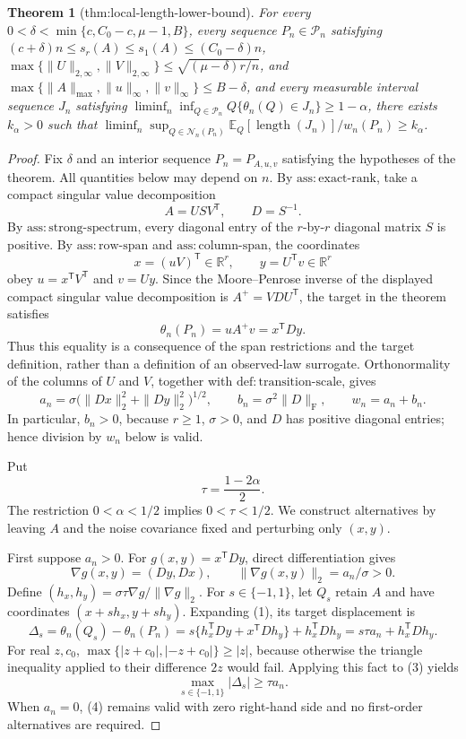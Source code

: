 \documentclass{article}
\newtheorem{theorem}{Theorem}
\begin{document}
\begin{theorem}[thm:local-length-lower-bound]\label{thm:local-length-lower-bound}
For every \(0<\delta<\min\{c,C_0-c,\mu-1,B\}\), every sequence \(P_n\in\mathcal P_n\) satisfying \((c+\delta)n\le s_r(A)\le s_1(A)\le(C_0-\delta)n\), \(\max\{\|U\|_{2,\infty},\|V\|_{2,\infty}\}\le\sqrt{(\mu-\delta)r/n}\), and \(\max\{\|A\|_{\max},\|u\|_\infty,\|v\|_\infty\}\le B-\delta\), and every measurable interval sequence \(J_n\) satisfying \(\liminf_n\inf_{Q\in\mathcal P_n}Q\{\theta_n(Q)\in J_n\}\ge1-\alpha\), there exists \(k_\alpha>0\) such that \(\liminf_n\sup_{Q\in\mathcal N_n(P_n)}\mathbb E_Q[\operatorname{length}(J_n)]/w_n(P_n)\ge k_\alpha\).
\end{theorem}
\begin{proof}
Fix \(\delta\) and an interior sequence \(P_n=P_{A,u,v}\) satisfying the hypotheses of the theorem.  All quantities below may depend on \(n\).  By \(\mathrm{ass{:}exact\mbox{-}rank}\), take a compact singular value decomposition
\[
A=USV^{\mathsf T},
\qquad
D=S^{-1}.
\]
By \(\mathrm{ass{:}strong\mbox{-}spectrum}\), every diagonal entry of the \(r\)-by-\(r\) diagonal matrix \(S\) is positive.  By \(\mathrm{ass{:}row\mbox{-}span}\) and \(\mathrm{ass{:}column\mbox{-}span}\), the coordinates
\[
x=(uV)^{\mathsf T}\in\mathbb R^r,
\qquad
y=U^{\mathsf T}v\in\mathbb R^r
\]
obey \(u=x^{\mathsf T}V^{\mathsf T}\) and \(v=Uy\).  Since the Moore--Penrose inverse of the displayed compact singular value decomposition is \(A^+=V D U^{\mathsf T}\), the target in the theorem satisfies
\[
\theta_n(P_n)=uA^+v=x^{\mathsf T}Dy. \tag{1}
\]
Thus this equality is a consequence of the span restrictions and the target definition, rather than a definition of an observed-law surrogate.  Orthonormality of the columns of \(U\) and \(V\), together with \(\mathrm{def{:}transition\mbox{-}scale}\), gives
\[
a_n=\sigma\bigl(\|Dx\|_2^2+\|Dy\|_2^2\bigr)^{1/2},
\qquad
b_n=\sigma^2\|D\|_{\mathrm F},
\qquad
w_n=a_n+b_n. \tag{2}
\]
In particular, \(b_n>0\), because \(r\geq1\), \(\sigma>0\), and \(D\) has positive diagonal entries; hence division by \(w_n\) below is valid.

Put
\[
\tau=\frac{1-2\alpha}{2}.
\]
The restriction \(0<\alpha<1/2\) implies \(0<\tau<1/2\).  We construct alternatives by leaving \(A\) and the noise covariance fixed and perturbing only \((x,y)\).

First suppose \(a_n>0\).  For \(g(x,y)=x^{\mathsf T}Dy\), direct differentiation gives
\[
\nabla g(x,y)=(Dy,Dx),
\qquad
\|\nabla g(x,y)\|_2=a_n/\sigma>0.
\]
Define \((h_x,h_y)=\sigma\tau\nabla g/\|\nabla g\|_2\).  For \(s\in\{-1,1\}\), let \(Q_s\) retain \(A\) and have coordinates \((x+s h_x,y+s h_y)\).  Expanding (1), its target displacement is
\[
\Delta_s
=\theta_n(Q_s)-\theta_n(P_n)
=s\{h_x^{\mathsf T}Dy+x^{\mathsf T}Dh_y\}+h_x^{\mathsf T}Dh_y
=s\tau a_n+h_x^{\mathsf T}Dh_y. \tag{3}
\]
For real \(z,c_0\), \(\max\{|z+c_0|,|-z+c_0|\}\geq |z|\), because otherwise the triangle inequality applied to their difference \(2z\) would fail.  Applying this fact to (3) yields
\[
\max_{s\in\{-1,1\}}|\Delta_s|\geq\tau a_n. \tag{4}
\]
When \(a_n=0\), (4) remains valid with zero right-hand side and no first-order alternatives are required.


\end{proof}
\end{document}
